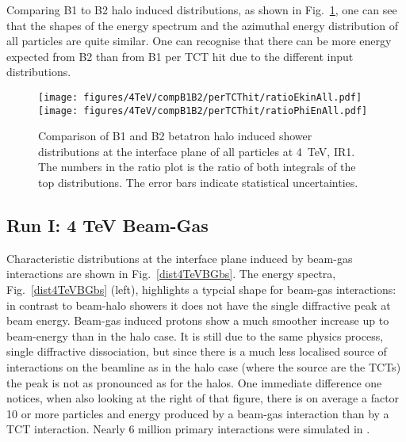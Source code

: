 Comparing B1 to B2 halo induced distributions, as shown in Fig.~\ref{fig:comp4TeVB1B2}, one can see that the shapes of the energy spectrum and the azimuthal energy distribution of all particles are quite similar. One can recognise that there can be more energy expected from B2 than from B1 per TCT hit due to the different input distributions.



\begin{figure}%
\begin{center}
\texttt{[image: figures/4TeV/compB1B2/perTCThit/ratioEkinAll.pdf]}
\texttt{[image: figures/4TeV/compB1B2/perTCThit/ratioPhiEnAll.pdf]}
\end{center}
\vspace{-0.6cm}
 \caption{Comparison of B1 and B2 betatron halo induced shower distributions at the interface plane of all particles at 4~TeV, IR1. The numbers in the ratio plot is the ratio of both integrals of the top distributions. The error bars indicate statistical uncertainties.
  \label{fig:comp4TeVB1B2}}
\end{figure}


\subsection{Run I: 4 TeV Beam-Gas}

Characteristic distributions at the interface plane induced by beam-gas interactions are shown in Fig.~\ref{dist4TeVBGbs}. The energy spectra, Fig.~\ref{dist4TeVBGbs} (left), highlights a typcial shape for beam-gas interactions: in contrast to beam-halo showers it does not have the single diffractive peak at beam energy. Beam-gas induced protons show a much smoother increase up to beam-energy than in the halo case. It is still due to the same physics process, single diffractive dissociation, but since there is a much less localised source of interactions on the beamline as in the halo case (where the source are the TCTs) the peak is not as pronounced as for the halos.
One immediate difference one notices, when also looking at the right of that figure, there is on average a factor 10 or more particles and energy produced by a beam-gas interaction than by a TCT interaction. Nearly 6 million primary interactions were simulated in \fluka.%


